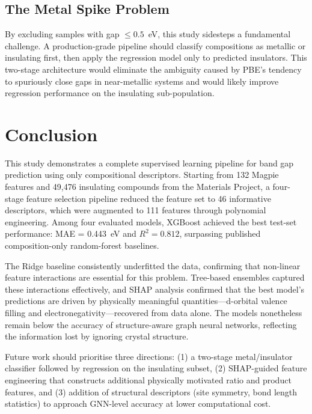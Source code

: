 \documentclass[conference]{IEEEtran}
\begin{document}
\subsection{The Metal Spike Problem}

By excluding samples with gap $\leq 0.5$~eV, this study sidesteps a fundamental challenge. A production-grade pipeline should classify compositions as metallic or insulating first, then apply the regression model only to predicted insulators. This two-stage architecture would eliminate the ambiguity caused by PBE's tendency to spuriously close gaps in near-metallic systems and would likely improve regression performance on the insulating sub-population.

\section{Conclusion}

This study demonstrates a complete supervised learning pipeline for band gap prediction using only compositional descriptors. Starting from 132 Magpie features and 49,476 insulating compounds from the Materials Project, a four-stage feature selection pipeline reduced the feature set to 46 informative descriptors, which were augmented to 111 features through polynomial engineering. Among four evaluated models, XGBoost achieved the best test-set performance: MAE = 0.443~eV and $R^2 = 0.812$, surpassing published composition-only random-forest baselines.

The Ridge baseline consistently underfitted the data, confirming that non-linear feature interactions are essential for this problem. Tree-based ensembles captured these interactions effectively, and SHAP analysis confirmed that the best model's predictions are driven by physically meaningful quantities---d-orbital valence filling and electronegativity---recovered from data alone. The models nonetheless remain below the accuracy of structure-aware graph neural networks, reflecting the information lost by ignoring crystal structure.

Future work should prioritise three directions: (1) a two-stage metal/insulator classifier followed by regression on the insulating subset, (2) SHAP-guided feature engineering that constructs additional physically motivated ratio and product features, and (3) addition of structural descriptors (site symmetry, bond length statistics) to approach GNN-level accuracy at lower computational cost.
\end{document}
